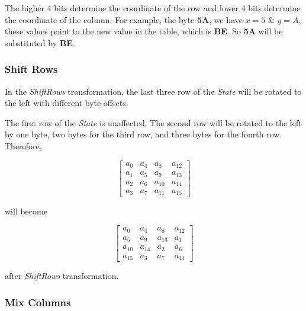 \documentclass[a4paper, 10pt]{article}
\begin{document}
\begin{multicols}{2}
            The higher 4 bits determine the coordinate of the row and lower 4 bits determine the coordinate of the column. For example, the byte \textbf{5A}, we have $x=5$ \& $y=A$, these values point to the new value in the table, which is \textbf{BE}. So \textbf{5A} will be substituted by \textbf{BE}.

            \subsubsection{Shift Rows}
            \label{sec:shift-rows-intro}

            In the \textit{ShiftRows} transformation, the last three row of the \textit{State} will be rotated to the left with different byte offsets.

            The first row of the \textit{State} is unaffected. The second row will be rotated to the left by one byte, two bytes for the third row, and three bytes for the fourth row. Therefore,

            \begin{equation}
                \begin{bmatrix}
                    a_{0} & a_{4} & a_{8} & a_{12}\\
                    a_{1} & a_{5} & a_{9} & a_{13}\\
                    a_{2} & a_{6} & a_{10} & a_{14}\\
                    a_{3} & a_{7} & a_{11} & a_{15}
                \end{bmatrix}
                \label{equ:shift-rows-example}
            \end{equation}

            will become

            \begin{equation}
                \begin{bmatrix}
                    a_{0} & a_{4} & a_{8} & a_{12}\\
                    a_{5} & a_{9} & a_{13} & a_{1}\\
                    a_{10} & a_{14} & a_{2} & a_{6}\\
                    a_{15} & a_{3} & a_{7} & a_{11}
                \end{bmatrix}
            \end{equation}

            after \textit{ShiftRows} transformation.

            \subsubsection{Mix Columns}
            \label{sec:mixcolumns}


\end{multicols}
\end{document}
